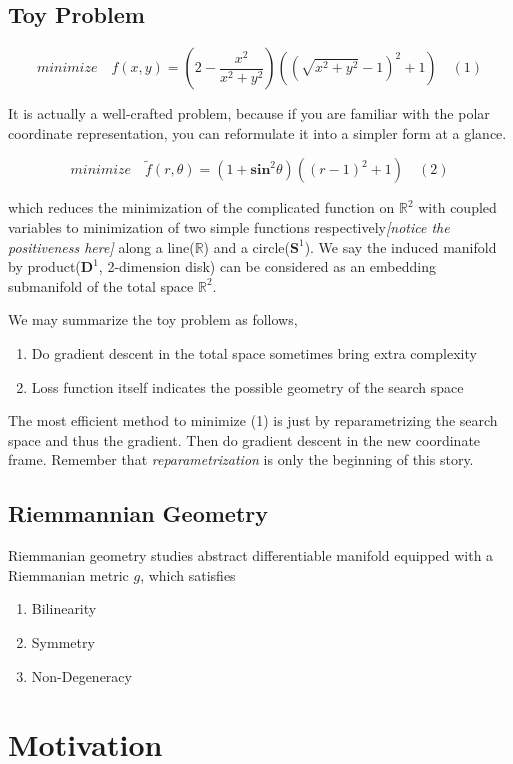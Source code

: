 \documentclass[letterpaper]{article}
\begin{document}
\subsection{Toy Problem}
$$
  minimize \quad f(x,y) = (2-\frac{x^2}{x^2+y^2})({({\sqrt{x^2+y^2}}-1)^2+1}) \quad (1)
$$

It is actually a well-crafted problem, because if you are familiar with the polar coordinate representation, you can reformulate
it into a simpler form at a glance.

$$
  minimize \quad \tilde{f}(r,\theta)=(1+\mathbf{sin}^2\theta)((r-1)^2+1) \quad (2)
$$

which reduces the minimization of the complicated function on $\mathbb{R}^2$ with coupled variables to minimization of two simple
functions respectively\textit{[notice the positiveness here]} along a line($\mathbb{R}$) and a circle($\mathbf{S}^1$). We say the induced manifold by product($\mathbf{D}^1$, 2-dimension disk) can be considered as an embedding submanifold of
the total space $\mathbb{R}^2$.

We may summarize the toy problem as follows,
\begin{enumerate}
  \item Do gradient descent in the total space sometimes bring extra complexity
  \item Loss function itself indicates the possible geometry of the search space
\end{enumerate}

The most efficient method to minimize (1) is just by reparametrizing the search space and thus the gradient. Then do gradient descent in
the new coordinate frame. Remember that \textit{reparametrization} is only the beginning of this story.

\subsection{Riemmannian Geometry}
Riemmanian geometry studies abstract differentiable manifold equipped with a Riemmanian metric $g$, which satisfies
\begin{enumerate}
  \item Bilinearity
  \item Symmetry
  \item Non-Degeneracy
\end{enumerate}




\section{Motivation}
\end{document}

